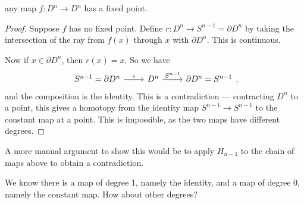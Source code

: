 \documentclass[a4paper]{article}
\begin{document}
\begin{cor}
  any map $f: D^n \to D^n$ has a fixed point.
\end{cor}

\begin{proof}
  Suppose $f$ has no fixed point. Define $r: D^n \to S^{n - 1} = \partial D^n$ by taking the intersection of the ray from $f(x)$ through $x$ with $\partial D^n$. This is continuous.
  \begin{center}
  \end{center}
  Now if $x \in \partial D^n$, then $r(x) = x$. So we have
  \[
    \begin{tikzcd}
      S^{n - 1} = \partial D^n \ar[r, "i"] & D^n \ar[r, "S^{n - 1}"] & \partial D^n = S^{n - 1}
    \end{tikzcd},
  \]
  and the composition is the identity. This is a contradiction --- contracting $D^n$ to a point, this gives a homotopy from the identity map $S^{n - 1} \to S^{n - 1}$ to the constant map at a point. This is impossible, as the two maps have different degrees.
\end{proof}
A more manual argument to show this would be to apply $H_{n - 1}$ to the chain of maps above to obtain a contradiction.

We know there is a map of degree $1$, namely the identity, and a map of degree $0$, namely the constant map. How about other degrees?
\end{document}
